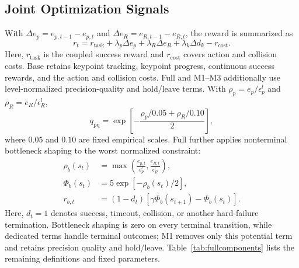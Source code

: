 \documentclass[conference]{IEEEtran}
\begin{document}
\subsection{Joint Optimization Signals}
With $\Delta e_p=e_{p,t-1}-e_{p,t}$ and $\Delta e_R=e_{R,t-1}-e_{R,t}$, the reward is summarized as
\begin{equation}
r_t=r_{\mathrm{task}}+\lambda_p\Delta e_p+\lambda_R\Delta e_R
 +\lambda_k\Delta d_k-r_{\mathrm{cost}} .
\label{eq:reward}
\end{equation}
Here, $r_{\mathrm{task}}$ is the coupled success reward and $r_{\mathrm{cost}}$ covers action and collision costs. Base retains keypoint tracking, keypoint progress, continuous success rewards, and the action and collision costs. Full and M1--M3 additionally use level-normalized precision-quality and hold/leave terms. With $\rho_p=e_p/\epsilon_p^l$ and $\rho_R=e_R/\epsilon_R^l$,
\begin{equation}
\label{eq:precision_quality}
q_{\mathrm{pq}}=\exp\left[-\frac{\rho_p/0.05+\rho_R/0.10}{2}\right],
\end{equation}
where $0.05$ and $0.10$ are fixed empirical scales. Full further applies nonterminal bottleneck shaping to the worst normalized constraint:
\begin{align}
\rho_b(s_t)&=\max\left(\frac{e_{p,t}}{\epsilon_p^l},\frac{e_{R,t}}{\epsilon_R^l}\right),\\
\Phi_b(s_t)&=5\exp[-\rho_b(s_t)/2],\\
r_{b,t}&=(1-d_t)[\gamma\Phi_b(s_{t+1})-\Phi_b(s_t)].
\label{eq:bottleneck}
\end{align}
Here, $d_t=1$ denotes success, timeout, collision, or another hard-failure termination. Bottleneck shaping is zero on every terminal transition, while dedicated terms handle terminal outcomes; M1 removes only this potential term and retains precision quality and hold/leave. Table~\ref{tab:fullcomponents} lists the remaining definitions and fixed parameters.
\end{document}
